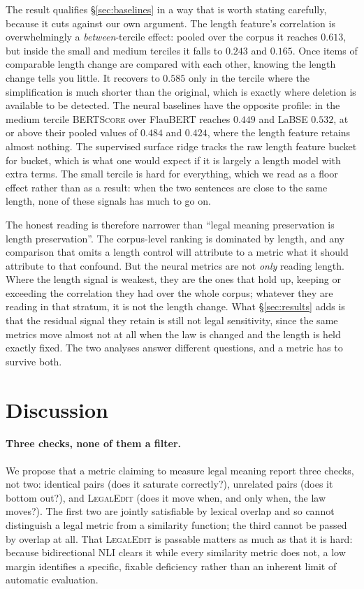 \documentclass[11pt]{article}
\begin{document}
The result qualifies \S\ref{sec:baselines} in a way that is worth stating
carefully, because it cuts against our own argument. The length feature's
correlation is overwhelmingly a \emph{between}-tercile effect: pooled over the
corpus it reaches $0.613$, but inside the small and medium terciles it falls to
$0.243$ and $0.165$. Once items of comparable length change are compared with
each other, knowing the length change tells you little. It recovers to $0.585$
only in the tercile where the simplification is much shorter than the original,
which is exactly where deletion is available to be detected. The neural
baselines have the opposite profile: in the medium tercile \textsc{BERTScore}
over FlauBERT reaches $0.449$ and LaBSE $0.532$, at or above their pooled values
of $0.484$ and $0.424$, where the length feature retains almost nothing. The
supervised surface ridge tracks the raw length feature bucket for bucket, which
is what one would expect if it is largely a length model with extra terms. The
small tercile is hard for everything, which we read as a floor effect rather
than as a result: when the two sentences are close to the same length, none of
these signals has much to go on.

The honest reading is therefore narrower than ``legal meaning preservation is
length preservation''. The corpus-level ranking is dominated by length, and any
comparison that omits a length control will attribute to a metric what it should
attribute to that confound. But the neural metrics are not \emph{only} reading
length. Where the length signal is weakest, they are the ones that hold up,
keeping or exceeding the correlation they had over the whole corpus; whatever
they are reading in that stratum, it is not the length change. What
\S\ref{sec:results} adds is that the residual signal they retain is still not
legal sensitivity, since the same metrics move almost not at all when the law is
changed and the length is held exactly fixed. The two analyses answer different
questions, and a metric has to survive both.

\section{Discussion}
\label{sec:discussion}

\paragraph{Three checks, none of them a filter.}
We propose that a metric claiming to measure legal meaning report three checks,
not two: identical pairs (does it saturate correctly?), unrelated pairs (does it
bottom out?), and \textsc{LegalEdit} (does it move when, and only when, the law
moves?). The first two are jointly satisfiable by lexical overlap and so cannot
distinguish a legal metric from a similarity function; the third cannot be
passed by overlap at all. That \textsc{LegalEdit} is passable matters as much as
that it is hard: because bidirectional NLI clears it while every similarity
metric does not, a low margin identifies a specific, fixable deficiency rather
than an inherent limit of automatic evaluation.
\end{document}
